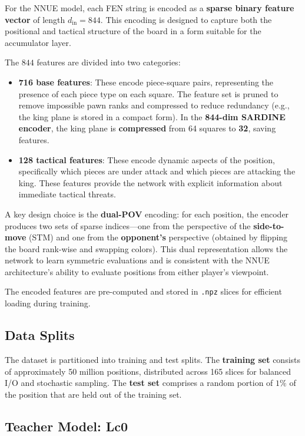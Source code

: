 For the NNUE model, each FEN string is encoded as a \textbf{sparse binary feature vector} of length \(d_{\mathrm{in}}=844\). This encoding is designed to capture both the positional and tactical structure of the board in a form suitable for the accumulator layer.

The \(844\) features are divided into two categories:
\begin{itemize}
    \item \textbf{716 base features}: These encode piece-square pairs, representing the presence of each piece type on each square. The feature set is pruned to remove impossible pawn ranks and compressed to reduce redundancy (e.g., the king plane is stored in a compact form). In the \textbf{844-dim SARDINE encoder}, the king plane is \textbf{compressed} from 64 squares to \textbf{32}, saving features.
    \item \textbf{128 tactical features}: These encode dynamic aspects of the position, specifically which pieces are under attack and which pieces are attacking the king. These features provide the network with explicit information about immediate tactical threats.
\end{itemize}

A key design choice is the \textbf{dual-POV} encoding: for each position, the encoder produces two sets of sparse indices---one from the perspective of the \textbf{side-to-move} (STM) and one from the \textbf{opponent's} perspective (obtained by flipping the board rank-wise and swapping colors). This dual representation allows the network to learn symmetric evaluations and is consistent with the NNUE architecture's ability to evaluate positions from either player's viewpoint.

The encoded features are pre-computed and stored in \texttt{.npz} slices for efficient loading during training.

\subsection{Data Splits}\label{sec:data-splits}

The dataset is partitioned into training and test splits. The \textbf{training set} consists of approximately 50 million positions, distributed across 165 slices for balanced I/O and stochastic sampling. The \textbf{test set} comprises a random portion of \(1\%\) of the position that are held out of the training set.

\subsection{Teacher Model: Lc0}\label{sec:teacher-lc0}

